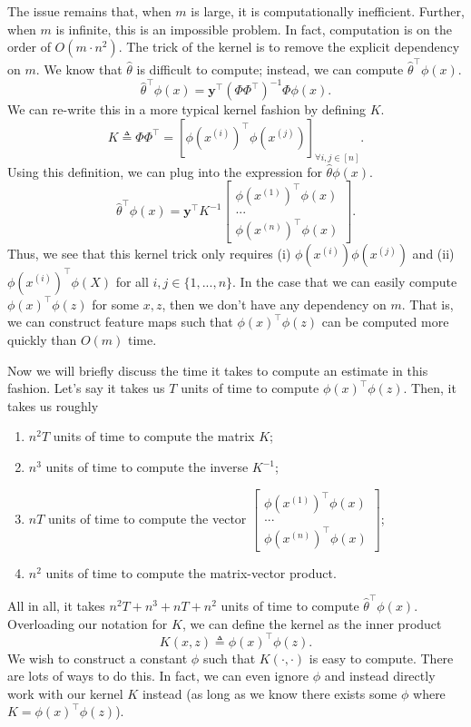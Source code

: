 The issue remains that, when $m$ is large, it is computationally inefficient. Further, when $m$ is infinite, this is an impossible problem. In fact, computation is on the order of $O(m \cdot n^2)$. \newline
{}
The trick of the kernel is to remove the explicit dependency on $m$. We know that $\hat{\theta}$ is difficult to compute; instead, we can compute $\hat{\theta}^\top \phi(x)$.
$$
\hat{\theta}^\top \phi(x) = \bm{y}^\top (\Phi\Phi^\top)^{-1}\Phi\phi(x).
$$
 We can re-write this in a more typical kernel fashion by defining $K$.
$$
K \triangleq \Phi\Phi^\top = \left[ \phi(x^{(i)})^\top \phi(x^{(j)}) \right]_{\forall i, j \in [n]}.
$$
Using this definition, we can plug into the expression for $\hat{\theta}\phi(x)$.
$$
\hat{\theta}^\top \phi(x) = \bm{y}^\top K^{-1} \begin{bmatrix} \phi(x^{(1)})^\top \phi(x) \\ ... \\ \phi(x^{(n)})^\top \phi(x) \end{bmatrix}.
$$
Thus, we see that this kernel trick only requires (i) $\phi(x^{(i)})\phi(x^{(j)})$ and (ii) $\phi(x^{(i)})^\top \phi(X)$ for all $i, j \in \{1, ..., n\}$. In the case that we can easily compute $\phi(x)^\top \phi(z)$ for some $x, z$, then we don't have any dependency on $m$. That is, we can construct feature maps such that $\phi(x)^\top \phi(z)$ can be computed more quickly than $O(m)$ time. 

Now we will briefly discuss the time it takes to compute an estimate in this fashion. Let's say it takes us $T$ units of time to compute $\phi(x)^\top \phi(z)$. Then, it takes us roughly
\begin{enumerate}
    \item $n^2T$ units of time to compute the matrix $K$;
    \item $n^3$ units of time to compute the inverse $K^{-1}$;
    \item $nT$ units of time to compute the vector $\begin{bmatrix} \phi(x^{(1)})^\top \phi(x) \\ ... \\ \phi(x^{(n)})^\top \phi(x) \end{bmatrix}$;
    \item $n^2$ units of time to compute the matrix-vector product.
\end{enumerate}
All in all, it takes $n^2T + n^3 + nT + n^2$ units of time to compute $\hat{\theta}^\top \phi(x)$. Overloading our notation for $K$, we can define the kernel as the inner product
$$
K(x, z) \triangleq \phi(x)^\top \phi(z).
$$
We wish to construct a constant $\phi$ such that $K(\cdot, \cdot)$ is easy to compute. There are lots of ways to do this. In fact, we can even ignore $\phi$ and instead directly work with our kernel $K$ instead (as long as we know there exists some $\phi$ where $K = \phi(x)^\top \phi(z)$).

